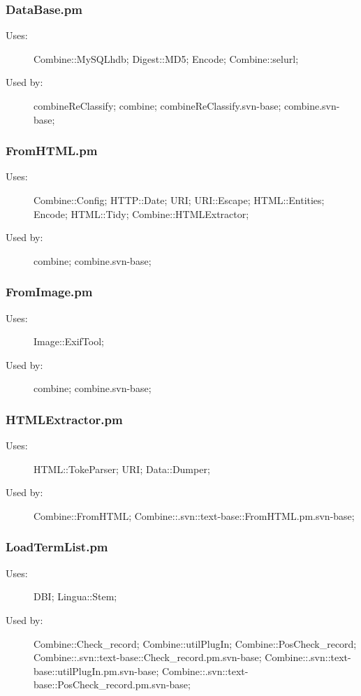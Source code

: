 \subsubsection{DataBase.pm}
\begin{description}
\item[Uses:] Combine::MySQLhdb; Digest::MD5; Encode; Combine::selurl; 

\item[Used by:] combineReClassify; combine; combineReClassify.svn-base; combine.svn-base; 

\end{description}
\subsubsection{FromHTML.pm}
\begin{description}
\item[Uses:] Combine::Config; HTTP::Date; URI; URI::Escape; HTML::Entities; Encode; HTML::Tidy; Combine::HTMLExtractor; 

\item[Used by:] combine; combine.svn-base; 

\end{description}
\subsubsection{FromImage.pm}
\begin{description}
\item[Uses:] Image::ExifTool; 

\item[Used by:] combine; combine.svn-base; 

\end{description}
\subsubsection{HTMLExtractor.pm}
\begin{description}
\item[Uses:] HTML::TokeParser; URI; Data::Dumper; 

\item[Used by:] Combine::FromHTML; Combine::.svn::text-base::FromHTML.pm.svn-base; 

\end{description}
\subsubsection{LoadTermList.pm}
\begin{description}
\item[Uses:] DBI; Lingua::Stem; 

\item[Used by:] Combine::Check\_record; Combine::utilPlugIn; Combine::PosCheck\_record; Combine::.svn::text-base::Check\_record.pm.svn-base; Combine::.svn::text-base::utilPlugIn.pm.svn-base; Combine::.svn::text-base::PosCheck\_record.pm.svn-base; 

\end{description}
